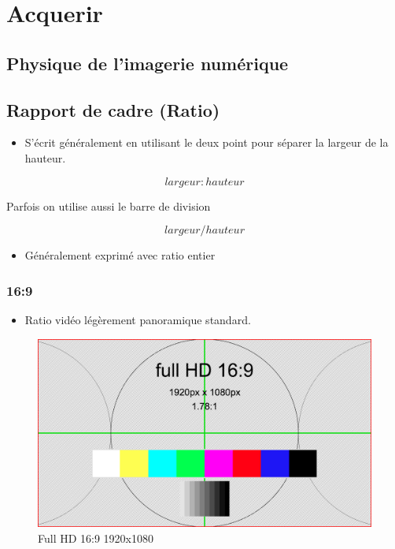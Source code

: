 \documentclass[
  french,
]{book}
\providecommand{\tightlist}{%
  \setlength{\itemsep}{0pt}\setlength{\parskip}{0pt}}
\begin{document}
\hypertarget{acquerir}{%
\chapter{Acquerir}\label{acquerir}}

\hypertarget{physique-de-limagerie-numuxe9rique}{%
\section{Physique de l'imagerie numérique}\label{physique-de-limagerie-numuxe9rique}}

\hypertarget{rapport-de-cadre-ratio}{%
\section{Rapport de cadre (Ratio)}\label{rapport-de-cadre-ratio}}

\begin{itemize}
\tightlist
\item
  S'écrit généralement en utilisant le deux point pour séparer la largeur de la hauteur.
\end{itemize}

\[
largeur : hauteur 
\]

Parfois on utilise aussi le barre de division

\[
largeur / hauteur 
\]

\begin{itemize}
\tightlist
\item
  Généralement exprimé avec ratio entier
\end{itemize}

\hypertarget{section-1}{%
\subsection{16:9}\label{section-1}}

\begin{itemize}
\tightlist
\item
  Ratio vidéo légèrement panoramique standard.
\end{itemize}

\begin{figure}
\centering
\includegraphics{medias/lexique/fullHD_16_9_1920x1080.png}
\caption{Full HD 16:9 1920x1080}
\end{figure}
\end{document}
